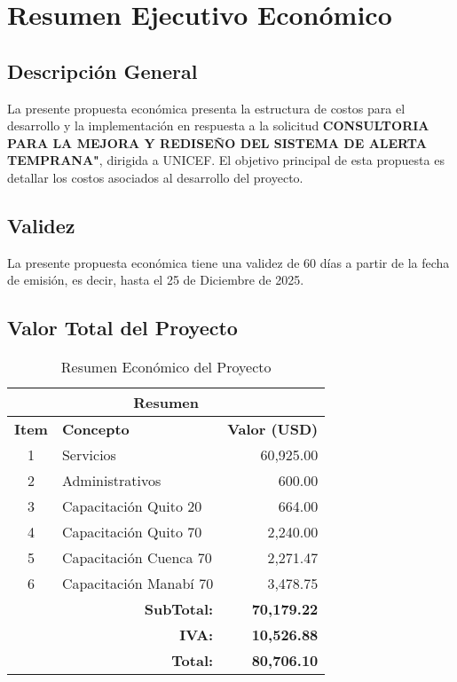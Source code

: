 \section{Resumen Ejecutivo Económico}

\subsection{Descripción General}
La presente propuesta económica presenta la estructura de costos para el desarrollo y la implementación en respuesta a la solicitud \textbf{CONSULTORIA PARA LA MEJORA Y REDISEÑO DEL SISTEMA DE ALERTA TEMPRANA"}, dirigida a UNICEF. El objetivo principal de esta propuesta es detallar los costos asociados al desarrollo del proyecto.
\subsection{Validez}
La presente propuesta económica tiene una validez de 60 días a partir de la fecha de emisión, es decir, hasta el 25 de Diciembre de 2025.
\subsection{Valor Total del Proyecto}
\begin{table}[h]
    \centering
    \begin{tabular}{|c|l|r|}
        \hline
        \multicolumn{3}{|c|}{\textbf{Resumen}} \\
        \hline
        \textbf{Item} & \textbf{Concepto} & \textbf{Valor (USD)} \\
        \hline
        1 & Servicios & 60,925.00 \\
        2 & Administrativos & 600.00 \\
        3 & Capacitación Quito 20 & 664.00 \\
        4 & Capacitación Quito 70 & 2,240.00 \\
        5 & Capacitación Cuenca 70 & 2,271.47 \\
        6 & Capacitación Manabí 70 & 3,478.75 \\
        \hline
        \multicolumn{2}{|r|}{\textbf{SubTotal:}} & \textbf{70,179.22} \\
        \multicolumn{2}{|r|}{\textbf{IVA:}} & \textbf{10,526.88} \\
        \hline
        \multicolumn{2}{|r|}{\textbf{Total:}} & \textbf{80,706.10} \\
        \hline
    \end{tabular}
    \caption{Resumen Económico del Proyecto}
    \label{tab:resumen-economico}
\end{table}
\newpage
